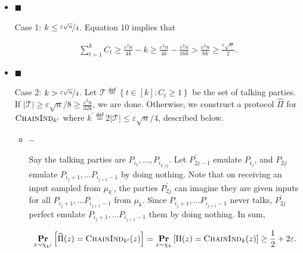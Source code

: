 \begin{itemize}


\item[] 
$\blacksquare$ 


Case 1: $k\leq\nicefrac{{\varepsilon\sqrt{n}}}{{4}}$.
Equation 10 implies that\par


\[\begin{gathered}
\sum_{t=1}^{k}C_{t}\geq\frac{\varepsilon^{2}n}{4k}-k\geq\frac{\varepsilon^{2}n}{4k}-\frac{\varepsilon^{2}n}{16k}>\frac{\varepsilon^{2}n}{8k}\geq\frac{\varepsilon\sqrt{n}}{2}.
\end{gathered}\]





\item[] 
$\blacksquare$ 


Case 2: $k>\nicefrac{{\varepsilon\sqrt{n}}}{{4}}$.
Let $\mathcal{T}\stackrel{{\scriptstyle\mathsf{def}}}{{=}}\left\{t\in[k]:C_{t}\geq 1\right\}$ be the set of talking parties.
If $|\mathcal{T}|\geq\varepsilon\sqrt{n}/8\geq\frac{\varepsilon^{2}n}{32k}$, we are done.
Otherwise, we construct a protocol $\widehat{\Pi}$ for $\textsc{ChainInd}_{k^{\prime}}$ where $k^{\prime}\stackrel{{\scriptstyle\mathsf{def}}}{{=}}2|\mathcal{T}|\leq\varepsilon\sqrt{n}/4$, described below.\par


\begin{itemize}


\item[] 
\textbf{–} 


Say the talking parties are $P_{i_{1}},\dots,P_{i_{k^{\prime}/2}}$.
Let $P_{2j-1}^{\prime}$ emulate $P_{i_{j}}$,
and $P_{2j}$ emulate $P_{i_{j}+1},\dots P_{i_{j+1}-1}$ by doing nothing.
Note that on receiving an input sampled from $\mu_{k^{\prime}}$, the parties $P_{2j}^{\prime}$ can imagine they are given inputs for all $P_{i_{j}+1},\dots P_{i_{j+1}-1}$ from $\mu_{k}$.
Since $P_{i_{j}+1},\dots P_{i_{j+1}-1}$ never talks, $P_{2j}^{\prime}$ perfect emulate $P_{i_{j}+1},\dots P_{i_{j+1}-1}$ them by doing nothing.
In sum,\par


\[\begin{gathered}
\operatorname*{\mathbf{Pr}}_{z\sim\chi_{k^{\prime}}}\left[\widehat{\Pi}(z)=\textsc{ChainInd}_{k^{\prime}}(z)\right]=\operatorname*{\mathbf{Pr}}_{z\sim\chi_{k}}\left[\Pi(z)=\textsc{ChainInd}_{k}(z)\right]\geq\frac{1}{2}+2\varepsilon.
\end{gathered}\]



\end{itemize}
\end{itemize}
